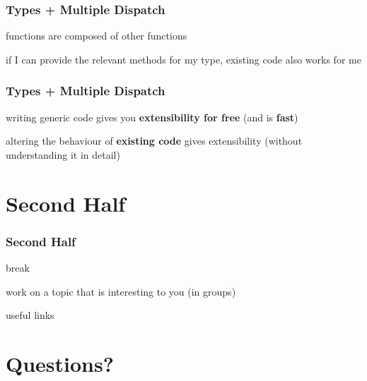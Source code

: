 \documentclass[notes]{beamer}
\newenvironment{wideitemize}{
    \itemize\addtolength{\itemsep}{15pt}\addtolength{\topsep}{10pt}}{\enditemize}
\begin{document}
    \begin{frame}
    \frametitle{Types + Multiple Dispatch}
    \vspace{1cm}
        \begin{wideitemize}
            \item functions are composed of other functions
            \item if I can provide the relevant methods for my type, existing code also works for me
        \end{wideitemize}
        \vspace{1cm}
    \end{frame}

    \begin{frame}
    \frametitle{Types + Multiple Dispatch}
    \vspace{1cm}
        \begin{wideitemize}
            \item writing generic code gives you \textbf{extensibility for free} (and is \textbf{fast})
            \item altering the behaviour of \textbf{existing code} gives extensibility (without understanding it in detail)
        \end{wideitemize}
    \end{frame}


    \section{Second Half}

    \begin{frame}
    \frametitle{Second Half}
    \vspace{1cm}
        \begin{wideitemize}
            \item break
            \item work on a topic that is interesting to you (in groups)
            \item useful links
        \end{wideitemize}
    \end{frame}

	\section{Questions?}
\end{document}
